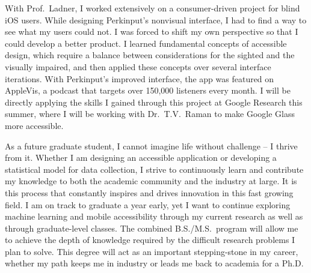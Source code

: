 \documentclass[12pt]{article}
\begin{document}
With Prof.\ Ladner, I worked extensively on a consumer-driven project for blind iOS users. While designing Perkinput's nonvisual interface, I had to find a way to see what my users could not. I was forced to shift my own perspective so that I could develop a better product. I learned fundamental concepts of accessible design, which require a balance between considerations for the sighted and the visually impaired, and then applied these concepts over several interface iterations. With Perkinput's improved interface, the app was featured on AppleVis, a podcast that targets over 150,000 listeners every month. I will be directly applying the skills I gained through this project at Google Research this summer, where I will be working with Dr.\ T.V.\ Raman to make Google Glass more accessible.\vspace{2 mm}

As a future graduate student, I cannot imagine life without challenge -- I thrive from it. Whether I am designing an accessible application or developing a statistical model for data collection, I strive to continuously learn and contribute my knowledge to both the academic community and the industry at large. It is this process that constantly inspires and drives innovation in this fast growing field. I am on track to graduate a year early, yet I want to continue exploring machine learning and mobile accessibility through my current research as well as through graduate-level classes. The combined B.S./M.S.\ program will allow me to achieve the depth of knowledge required by the difficult research problems I plan to solve. This degree will act as an important stepping-stone in my career, whether my path keeps me in industry or leads me back to academia for a Ph.D.\
\end{document}
